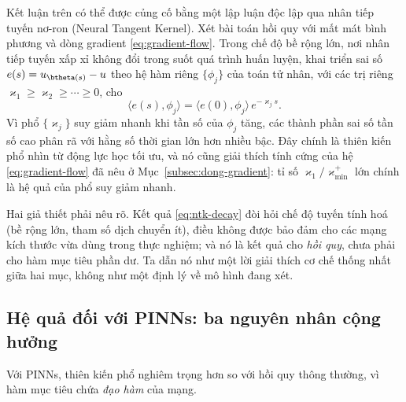 \begin{nhanxet}
\label{rem:ntk-view}
Kết luận trên có thể được củng cố bằng một lập luận độc lập qua nhân tiếp tuyến
nơ-ron (Neural Tangent Kernel). Xét bài toán hồi quy với mất mát bình phương và
dòng gradient \eqref{eq:gradient-flow}. Trong chế độ bề rộng lớn, nơi nhân tiếp
tuyến xấp xỉ không đổi trong suốt quá trình huấn luyện, khai triển sai số
$e(s) = u_{\btheta(s)} - u$ theo hệ hàm riêng $\{\phi_{j}\}$ của toán tử nhân,
với các trị riêng $\varkappa_{1} \ge \varkappa_{2} \ge \cdots \ge 0$, cho
\begin{equation}
\langle e(s), \phi_{j} \rangle
= \langle e(0), \phi_{j} \rangle\, e^{-\varkappa_{j} s}.
\label{eq:ntk-decay}
\end{equation}
Vì phổ $\{\varkappa_{j}\}$ suy giảm nhanh khi tần số của $\phi_{j}$ tăng, các
thành phần sai số tần số cao phân rã với hằng số thời gian lớn hơn nhiều bậc. Đây
chính là thiên kiến phổ nhìn từ động lực học tối ưu, và nó cũng giải thích tính
cứng của hệ \eqref{eq:gradient-flow} đã nêu ở Mục~\ref{subsec:dong-gradient}: tỉ
số $\varkappa_1/\varkappa_{\min}^{+}$ lớn chính là hệ quả của phổ suy giảm nhanh.
 
Hai giả thiết phải nêu rõ. Kết quả \eqref{eq:ntk-decay} đòi hỏi chế độ tuyến tính
hoá (bề rộng lớn, tham số dịch chuyển ít), điều không được bảo đảm cho các mạng
kích thước vừa dùng trong thực nghiệm; và nó là kết quả cho \emph{hồi quy}, chưa
phải cho hàm mục tiêu phần dư. Ta dẫn nó như một lời giải thích cơ chế thống nhất
giữa hai mục, không như một định lý về mô hình đang xét.
\end{nhanxet}
 
\subsection{Hệ quả đối với PINNs: ba nguyên nhân cộng hưởng}
\label{subsec:he-qua-pinn}
 
Với PINNs, thiên kiến phổ nghiêm trọng hơn so với hồi quy thông thường, vì hàm
mục tiêu chứa \emph{đạo hàm} của mạng.
 

